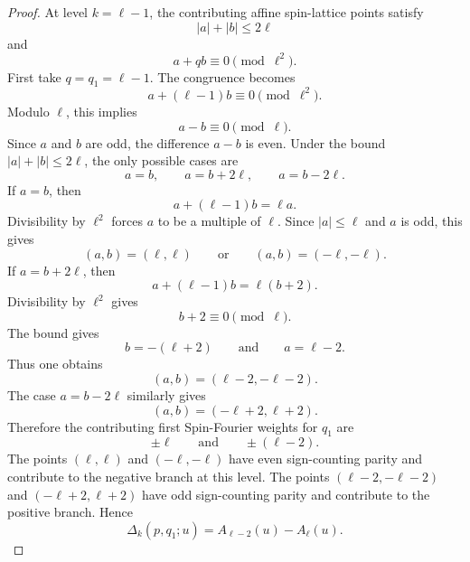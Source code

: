 \documentclass[10pt,a4paper]{amsart}
\begin{document}
\begin{proof}
At level $k=\ell-1$, the contributing affine spin-lattice points satisfy
\begin{equation}
|a|+|b|\leq 2\ell
\end{equation}
and
\begin{equation}
a+qb\equiv0\pmod{\ell^2}.
\end{equation}
First take $q=q_1=\ell-1$.  The congruence becomes
\begin{equation}
a+(\ell-1)b\equiv0\pmod{\ell^2}.
\end{equation}
Modulo $\ell$, this implies
\begin{equation}
a-b\equiv0\pmod{\ell}.
\end{equation}
Since $a$ and $b$ are odd, the difference $a-b$ is even.  Under the bound $|a|+|b|\leq2\ell$, the only possible cases are
\begin{equation}
a=b,
\qquad
a=b+2\ell,
\qquad
a=b-2\ell.
\end{equation}
If $a=b$, then
\begin{equation}
a+(\ell-1)b=\ell a.
\end{equation}
Divisibility by $\ell^2$ forces $a$ to be a multiple of $\ell$.  Since $|a|\leq\ell$ and $a$ is odd, this gives
\begin{equation}
(a,b)=(\ell,\ell)
\qquad\text{or}\qquad
(a,b)=(-\ell,-\ell).
\end{equation}
If $a=b+2\ell$, then
\begin{equation}
a+(\ell-1)b=\ell(b+2).
\end{equation}
Divisibility by $\ell^2$ gives
\begin{equation}
b+2\equiv0\pmod{\ell}.
\end{equation}
The bound gives
\begin{equation}
b=-(\ell+2)
\qquad\text{and}\qquad
a=\ell-2.
\end{equation}
Thus one obtains
\begin{equation}
(a,b)=(\ell-2,-\ell-2).
\end{equation}
The case $a=b-2\ell$ similarly gives
\begin{equation}
(a,b)=(-\ell+2,\ell+2).
\end{equation}
Therefore the contributing first Spin-Fourier weights for $q_1$ are
\begin{equation}
\pm\ell
\qquad\text{and}\qquad
\pm(\ell-2).
\end{equation}
The points $(\ell,\ell)$ and $(-\ell,-\ell)$ have even sign-counting parity and contribute to the negative branch at this level.  The points $(\ell-2,-\ell-2)$ and $(-\ell+2,\ell+2)$ have odd sign-counting parity and contribute to the positive branch.  Hence
\begin{equation}
\Delta_k(p,q_1;u)=A_{\ell-2}(u)-A_{\ell}(u).
\end{equation}


\end{proof}
\end{document}

